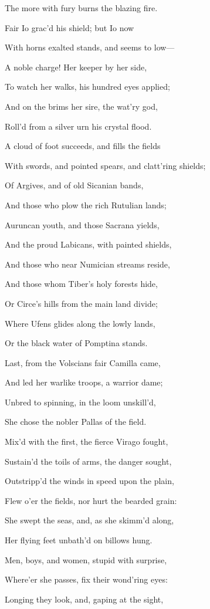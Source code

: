 The more with fury burns the blazing fire.

Fair Io grac’d his shield; but Io now

With horns exalted stands, and seems to low—

A noble charge! Her keeper by her side,

To watch her walks, his hundred eyes applied;

And on the brims her sire, the wat’ry god,

Roll’d from a silver urn his crystal flood.

A cloud of foot succeeds, and fills the fields

With swords, and pointed spears, and clatt’ring shields;

Of Argives, and of old Sicanian bands,

And those who plow the rich Rutulian lands;

Auruncan youth, and those Sacrana yields,

And the proud Labicans, with painted shields,

And those who near Numician streams reside,

And those whom Tiber’s holy forests hide,

Or Circe’s hills from the main land divide;

Where Ufens glides along the lowly lands,

Or the black water of Pomptina stands.

Last, from the Volscians fair Camilla came,

And led her warlike troops, a warrior dame;

Unbred to spinning, in the loom unskill’d,

She chose the nobler Pallas of the field.

Mix’d with the first, the fierce Virago fought,

Sustain’d the toils of arms, the danger sought,

Outstripp’d the winds in speed upon the plain,

Flew o’er the fields, nor hurt the bearded grain:

She swept the seas, and, as she skimm’d along,

Her flying feet unbath’d on billows hung.

Men, boys, and women, stupid with surprise,

Where’er she passes, fix their wond’ring eyes:

Longing they look, and, gaping at the sight,

